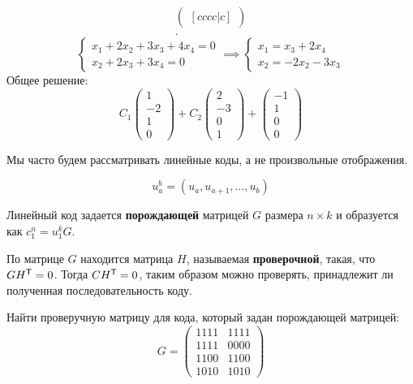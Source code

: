 \begin{example}
\begin{align*}
\begin{pmatrix}[cccc|c]
            \end{pmatrix} \\
        .\end{align*}
    \[\begin{cases}
        x_1 + 2x_2 + 3x_3 + 4x_4 = 0 \\
        x_2 + 2x_3 + 3x_4 = 0
    \end{cases} \implies \begin{cases}
        x_1 = x_3 + 2x_4 \\
        x_2 = -2x_2 - 3x_3
    \end{cases}\] 
    Общее решение:
    \[
        C_1 \begin{pmatrix} 1 \\ -2 \\ 1 \\ 0 \end{pmatrix}
        + C_2 \begin{pmatrix} 2 \\ -3 \\ 0 \\ 1 \end{pmatrix} 
        + \begin{pmatrix} -1 \\ 1 \\ 0 \\ 0 \end{pmatrix} 
    \] 
\end{example}

Мы часто будем рассматривать линейные коды, а не произвольные отображения.

\begin{notation}
    \[u_a^b = (u_a, u_{a + 1}, \ldots, u_b)\] 
\end{notation}

Линейный код задается \textbf{порождающей} матрицей \(G\) размера \(n \times k\) и образуется как \(c_1^n = u_1^k G\).

По матрице \(G\) находится матрица \(H\), называемая \textbf{проверочной}, такая, что \(G H^{\mathsf{T}} = 0\). Тогда \(C H^{\mathsf{T}} = 0\), таким образом можно проверять, принадлежит ли полученная последовательность коду.

\begin{example}
    Найти проверучную матрицу для кода, который задан порождающей матрицей:
    \[G = \begin{pmatrix} 1111 & 1111 \\ 1111 & 0000 \\ 1100 & 1100 \\ 1010 & 1010 \end{pmatrix}\] 

\end{example}


